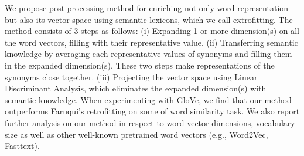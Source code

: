 We propose post-processing method for enriching not only word representation but also its vector space using semantic lexicons, which we call extrofitting. The method consists of 3 steps as follows: (i) Expanding 1 or more dimension(s) on all the word vectors, filling with their representative value. (ii) Transferring semantic knowledge by averaging each representative values of synonyms and filling them in the expanded dimension(s). These two steps make representations of the synonyms close together. (iii) Projecting the vector space using Linear Discriminant Analysis, which eliminates the expanded dimension(s) with semantic knowledge. When experimenting with GloVe, we find that our method outperforms Faruqui's retrofitting on some of word similarity task. We also report further analysis on our method in respect to word vector dimensions, vocabulary size as well as other well-known pretrained word vectors (e.g., Word2Vec, Fasttext).
